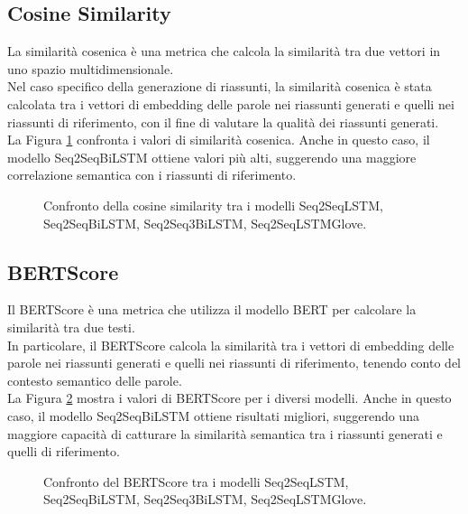 \subsection{Cosine Similarity}
La similarit\`a cosenica \`e una metrica che calcola la similarit\`a tra due vettori in uno spazio multidimensionale.\\
Nel caso specifico della generazione di riassunti, la similarit\`a cosenica \`e stata calcolata tra i vettori di embedding delle parole nei riassunti generati e quelli nei riassunti di riferimento, con il fine di valutare la qualit\`a dei riassunti generati.\\
La Figura \ref{fig:cosine_similarity_comparison} confronta i valori di similarit\`a cosenica. Anche in questo caso, il modello Seq2SeqBiLSTM ottiene valori pi\`u alti, suggerendo una maggiore correlazione semantica con i riassunti di riferimento.

\begin{figure}[H]
    \centering
    \hfill
    \hfill
    \hfill
    
    \caption{Confronto della cosine similarity tra i modelli Seq2SeqLSTM, Seq2SeqBiLSTM, Seq2Seq3BiLSTM, Seq2SeqLSTMGlove.}
    \label{fig:cosine_similarity_comparison}
\end{figure}

\subsection{BERTScore}
Il BERTScore \`e una metrica che utilizza il modello BERT per calcolare la similarit\`a tra due testi.\\
In particolare, il BERTScore calcola la similarit\`a tra i vettori di embedding delle parole nei riassunti generati e quelli nei riassunti di riferimento, tenendo conto del contesto semantico delle parole.\\
La Figura \ref{fig:bert_score_comparison} mostra i valori di BERTScore per i diversi modelli. Anche in questo caso, il modello Seq2SeqBiLSTM ottiene risultati migliori, suggerendo una maggiore capacit\`a di catturare la similarit\`a semantica tra i riassunti generati e quelli di riferimento.

\begin{figure}[H]
    \centering
    \hfill
    \hfill
    \hfill
    
    \caption{Confronto del BERTScore tra i modelli Seq2SeqLSTM, Seq2SeqBiLSTM, Seq2Seq3BiLSTM, Seq2SeqLSTMGlove.}
    \label{fig:bert_score_comparison}
\end{figure}

